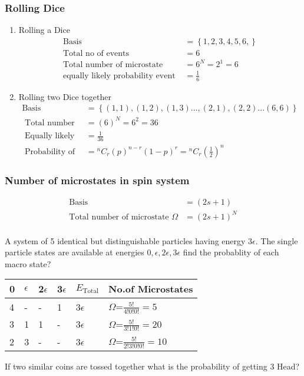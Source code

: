 \subsubsection{ Rolling Dice}
\begin{enumerate}
	\item Rolling a Dice
	\begin{align*}
	\text{Basis }&=\left\lbrace 1,2,3,4,5,6,\right\rbrace \\
	\text{Total no of events }&=6\\
	\text{Total number of microstate }&=6^N=2^1=6 \\
	\text{equally likely probability event }&=\frac{1}{6} 
	\end{align*}
	\item {Rolling two Dice together}
	\begin{align*}
	\text{Basis }&=\left\lbrace (1,1), (1,2),(1,3)..., (2,1),(2,2)...(6,6)\right\rbrace \\
	\text{ Total number of microstates }&=(6)^{N}=6^2=36\\
	\text{ Equally likely Probability }&=\frac{1}{36} \\
	\text { Probability of general event } 
	&={ }^{n} C_{r}(p)^{n-r}(1-p)^{r} =
	{ }^{n} C_{r}\left(\frac{1}{2}\right)^{n}
	\end{align*}
\end{enumerate}
\subsubsection{ Number of microstates in spin system}
\begin{align*}
\text{Basis }&=(2s+1) \\
\text{Total number of microstate }\Omega&=(2 s+1)^{N} \\
\end{align*}


\begin{exercise}
	A system of 5 identical but distinguishable particles having energy $3\epsilon$. The single particle states are available at energies $0,\epsilon,2\epsilon,3\epsilon$ find the probablity of each macro state?
\end{exercise}
\renewcommand*{\arraystretch}{2}
\begin{tabular}{|p{1cm}|p{1cm}|p{1cm}|p{1cm}|p{1cm}|p{3cm}|}
	\hline
	0&$\epsilon$&2$\epsilon$&3$\epsilon$&$E_{\text{Total}}$&No.of Microstates\\\hline
	4&-&-&1&3$\epsilon$&$\Omega$=$\frac{5!}{4!0!0!}=5$\\\hline
	3&1&1&-&3$\epsilon$&$\Omega$=$\frac{5!}{3!1!0!}=20$\\\hline
	2&3&-&-&3$\epsilon$&$\Omega$=$\frac{5!}{2!3!0!0!}=10$\\\hline
\end{tabular}
\begin{exercise}
	If two similar coins are tossed together what is the probability of getting 3 Head?
\end{exercise}

